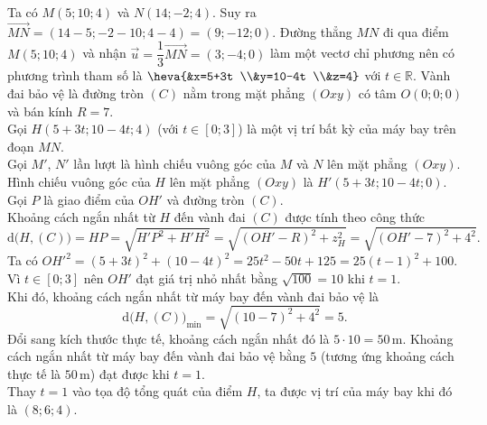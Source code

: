 \begin{ex}
{\begin{center}
\begin{tikzpicture}[scale=0.6, font=\footnotesize, line join=round, line cap=round, >=stealth]
			\end{tikzpicture}
		\end{center}
		\begin{itemchoice}
			\itemch Ta có $M(5;10;4)$ và $N(14;-2;4)$. Suy ra $\overrightarrow{MN}=(14-5;-2-10;4-4)=(9;-12;0)$.
			\itemch Đường thẳng $MN$ đi qua điểm $M(5;10;4)$ và nhận $\vec{u}=\dfrac{1}{3}\overrightarrow{MN}=(3;-4;0)$ làm một vectơ chỉ phương nên có phương trình tham số là $\heva{&x=5+3t \\&y=10-4t \\&z=4}$ với $t \in \mathbb{R}$.
			\itemch Vành đai bảo vệ là đường tròn $(C)$ nằm trong mặt phẳng $(Oxy)$ có tâm $O(0;0;0)$ và bán kính $R=7$.\\
			Gọi $H(5+3t;10-4t;4)$ (với $t \in [0;3]$) là một vị trí bất kỳ của máy bay trên đoạn $MN$.\\
			Gọi $M'$, $N'$ lần lượt là hình chiếu vuông góc của $M$ và $N$ lên mặt phẳng $(Oxy)$.\\
			Hình chiếu vuông góc của $H$ lên mặt phẳng $(Oxy)$ là $H'(5+3t; 10-4t; 0)$.\\
			Gọi $P$ là giao điểm của $OH'$ và đường tròn $(C)$.\\
			Khoảng cách ngắn nhất từ $H$ đến vành đai $(C)$ được tính theo công thức
			\[\mathrm{d}\big(H, (C)\big) = HP = \sqrt{H'P^2+H'H^2} = \sqrt{(OH' - R)^2 + z_H^2} = \sqrt{(OH' - 7)^2 + 4^2}.\]
			Ta có $OH'^2 = (5+3t)^2 + (10-4t)^2 = 25t^2 - 50t + 125 = 25(t-1)^2 + 100$.\\
			Vì $t \in [0;3]$ nên $OH'$ đạt giá trị nhỏ nhất bằng $\sqrt{100} = 10$ khi $t = 1$.\\
			Khi đó, khoảng cách ngắn nhất từ máy bay đến vành đai bảo vệ là
			\[\mathrm{d}\big(H, (C)\big)_{\min} = \sqrt{(10-7)^2 + 4^2} = 5.\]
			Đổi sang kích thước thực tế, khoảng cách ngắn nhất đó là $5\cdot 10 = 50$\,m.
			\itemch Khoảng cách ngắn nhất từ máy bay đến vành đai bảo vệ bằng $5$ (tương ứng khoảng cách thực tế là $50$\,m) đạt được khi $t=1$.\\
			Thay $t=1$ vào tọa độ tổng quát của điểm $H$, ta được vị trí của máy bay khi đó là $(8;6;4)$.
		\end{itemchoice}
	}
\end{ex}

